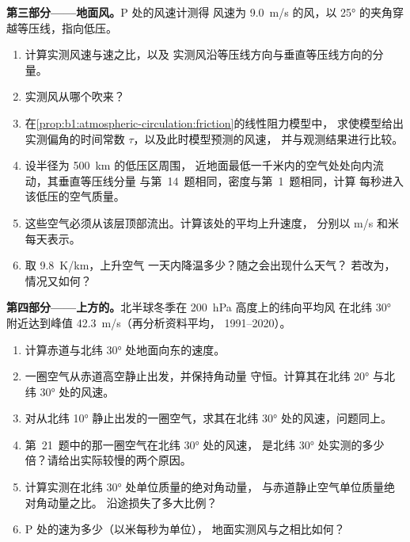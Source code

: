 \begin{problem}
\medskip
\noindent\textbf{第三部分——地面风。}P 处的风速计测得
风速为 \qty{9.0}{m/s} 的风，以 \ang{25} 的夹角穿越等压线，指向低压。
\begin{enumerate}[resume]
  \item 计算实测风速与速之比，以及
        实测风沿等压线方向与垂直等压线方向的分量。
  \item 实测风从哪个吹来？
  \item 在\cref{prop:b1:atmospheric-circulation:friction}的线性阻力模型中，
        求使模型给出实测偏角的时间常数 $\tau$，以及此时模型预测的风速，
        并与观测结果进行比较。
  \item 设半径为 \qty{500}{km} 的低压区周围，
        近地面最低一千米内的空气处处向内流动，其垂直等压线分量
        与第~14~题相同，密度与第~1~题相同，计算
        每秒进入该低压的空气质量。
  \item 这些空气必须从该层顶部流出。计算该处的平均上升速度，
        分别以 \unit{m/s} 和米每天表示。
  \item 取 \qty{9.8}{K/km}，上升空气
        一天内降温多少？随之会出现什么天气？
        若改为，情况又如何？
\end{enumerate}

\medskip
\noindent\textbf{第四部分——上方的。}北半球冬季在 \qty{200}{hPa} 高度上的纬向平均风
在北纬 \ang{30} 附近达到峰值 \qty{42.3}{m/s}（再分析资料平均，
1991--2020）。
\begin{enumerate}[resume]
  \item 计算赤道与北纬 \ang{30} 处地面向东的速度。
  \item 一圈空气从赤道高空静止出发，并保持角动量
        守恒。计算其在北纬 \ang{20} 与北纬 \ang{30} 处的风速。
  \item 对从北纬 \ang{10} 静止出发的一圈空气，求其在北纬 \ang{30} 处的风速，问题同上。
  \item 第~21~题中的那一圈空气在北纬 \ang{30} 处的风速，
        是北纬 \ang{30} 处实测的多少倍？请给出实际较慢的两个原因。
  \item 计算实测在北纬 \ang{30} 处单位质量的绝对角动量，
        与赤道静止空气单位质量绝对角动量之比。
        沿途损失了多大比例？
  \item P 处的速为多少（以米每秒为单位），
        地面实测风与之相比如何？
\end{enumerate}
\end{problem}
